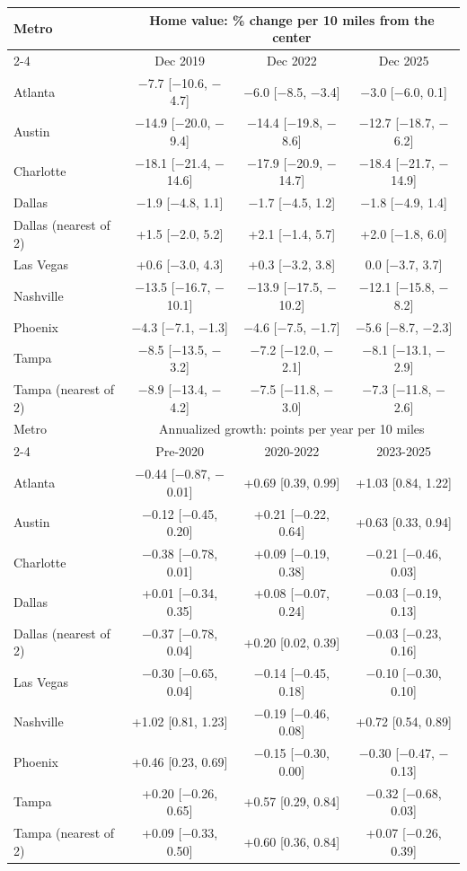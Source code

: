 \footnotesize\setlength{\tabcolsep}{4pt}
\begin{tabular}{lccc}
\toprule
Metro & \multicolumn{3}{c}{Home value: \% change per 10 miles from the center} \\
\cmidrule(lr){2-4}
 & Dec 2019 & Dec 2022 & Dec 2025 \\
\midrule
Atlanta & $-$7.7 [$-$10.6, $-$4.7] & $-$6.0 [$-$8.5, $-$3.4] & $-$3.0 [$-$6.0, 0.1] \\
Austin & $-$14.9 [$-$20.0, $-$9.4] & $-$14.4 [$-$19.8, $-$8.6] & $-$12.7 [$-$18.7, $-$6.2] \\
Charlotte & $-$18.1 [$-$21.4, $-$14.6] & $-$17.9 [$-$20.9, $-$14.7] & $-$18.4 [$-$21.7, $-$14.9] \\
Dallas & $-$1.9 [$-$4.8, 1.1] & $-$1.7 [$-$4.5, 1.2] & $-$1.8 [$-$4.9, 1.4] \\
Dallas (nearest of 2) & +1.5 [$-$2.0, 5.2] & +2.1 [$-$1.4, 5.7] & +2.0 [$-$1.8, 6.0] \\
Las Vegas & +0.6 [$-$3.0, 4.3] & +0.3 [$-$3.2, 3.8] & 0.0 [$-$3.7, 3.7] \\
Nashville & $-$13.5 [$-$16.7, $-$10.1] & $-$13.9 [$-$17.5, $-$10.2] & $-$12.1 [$-$15.8, $-$8.2] \\
Phoenix & $-$4.3 [$-$7.1, $-$1.3] & $-$4.6 [$-$7.5, $-$1.7] & $-$5.6 [$-$8.7, $-$2.3] \\
Tampa & $-$8.5 [$-$13.5, $-$3.2] & $-$7.2 [$-$12.0, $-$2.1] & $-$8.1 [$-$13.1, $-$2.9] \\
Tampa (nearest of 2) & $-$8.9 [$-$13.4, $-$4.2] & $-$7.5 [$-$11.8, $-$3.0] & $-$7.3 [$-$11.8, $-$2.6] \\
\midrule
Metro & \multicolumn{3}{c}{Annualized growth: points per year per 10 miles} \\
\cmidrule(lr){2-4}
 & Pre-2020 & 2020-2022 & 2023-2025 \\
\midrule
Atlanta & $-$0.44 [$-$0.87, $-$0.01] & +0.69 [0.39, 0.99] & +1.03 [0.84, 1.22] \\
Austin & $-$0.12 [$-$0.45, 0.20] & +0.21 [$-$0.22, 0.64] & +0.63 [0.33, 0.94] \\
Charlotte & $-$0.38 [$-$0.78, 0.01] & +0.09 [$-$0.19, 0.38] & $-$0.21 [$-$0.46, 0.03] \\
Dallas & +0.01 [$-$0.34, 0.35] & +0.08 [$-$0.07, 0.24] & $-$0.03 [$-$0.19, 0.13] \\
Dallas (nearest of 2) & $-$0.37 [$-$0.78, 0.04] & +0.20 [0.02, 0.39] & $-$0.03 [$-$0.23, 0.16] \\
Las Vegas & $-$0.30 [$-$0.65, 0.04] & $-$0.14 [$-$0.45, 0.18] & $-$0.10 [$-$0.30, 0.10] \\
Nashville & +1.02 [0.81, 1.23] & $-$0.19 [$-$0.46, 0.08] & +0.72 [0.54, 0.89] \\
Phoenix & +0.46 [0.23, 0.69] & $-$0.15 [$-$0.30, 0.00] & $-$0.30 [$-$0.47, $-$0.13] \\
Tampa & +0.20 [$-$0.26, 0.65] & +0.57 [0.29, 0.84] & $-$0.32 [$-$0.68, 0.03] \\
Tampa (nearest of 2) & +0.09 [$-$0.33, 0.50] & +0.60 [0.36, 0.84] & +0.07 [$-$0.26, 0.39] \\
\bottomrule
\end{tabular}
